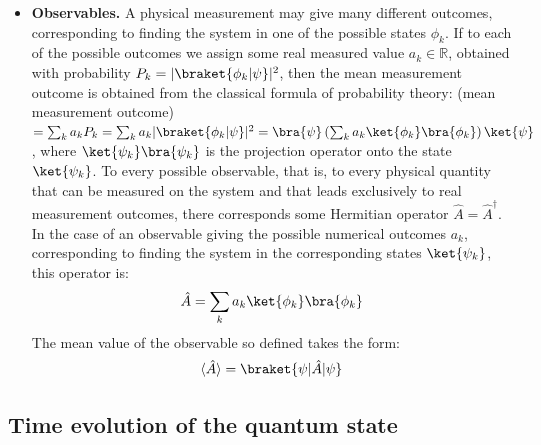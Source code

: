 \begin{itemize}
    \item \textbf{Observables.} A physical measurement may give many different outcomes, corresponding to finding the system in one of the possible states $\phi_{k}$. If to each of the possible outcomes we assign some real measured value $a_{k} \in \mathbb{R}$, obtained with probability $P_{k} = |\braket{\phi_{k}|\psi}|^{2}$, then the mean measurement outcome is obtained from the classical formula of probability theory: %
    (mean measurement outcome) $= \sum_{k}a_{k}P_{k} = \sum_{k}a_{k}|\braket{\phi_{k}|\psi}|^{2} = \bra{\psi}\left(\sum_{k}a_{k}\ket{\phi_{k}}\bra{\phi_{k}}\right)\ket{\psi}$, where $\ket{\psi_{k}}\bra{\psi_{k}}$ is the projection operator onto the state $\ket{\psi_{k}}$. To every possible observable, that is, to every physical quantity that can be measured on the system and that leads exclusively to real measurement outcomes, there corresponds some Hermitian operator $\hat{A} = \hat{A}^{\dag}$. In the case of an observable giving the possible numerical outcomes $a_{k}$, corresponding to finding the system in the corresponding states $\ket{\psi_{k}}$, this operator is:
    \begin{equation}
        \hat{A} = \sum_{k}a_{k}\ket{\phi_{k}}\bra{\phi_{k}}
    \end{equation}
    The mean value of the observable so defined takes the form:
    \begin{equation}
        \langle\hat{A}\rangle = \braket{\psi|\hat{A}|\psi}
    \end{equation}
\end{itemize}

\subsection{Time evolution of the quantum state}

